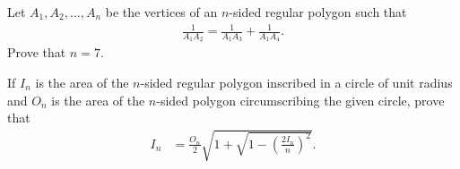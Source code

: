 \begin{question}
    Let $A_1,A_2,\dots,A_n$ be the vertices of an $n$-sided regular polygon such that
    \begin{align*}
        \frac{1}{A_1A_2} = \frac{1}{A_1A_3} + \frac{1}{A_1A_4}.
    \end{align*}
    Prove that $n=7$.
\end{question}


\begin{question}[name=2003 IIT JEE]
    If $I_n$ is the area of the $n$-sided regular polygon inscribed in a circle of unit radius and $O_n$ is the area of the $n$-sided polygon circumscribing the given circle, prove that
    \begin{align*}
        I_n &= \frac{O_n}{2}\sqrt{1+\sqrt{1-\left(\frac{2I_n}{n}\right)^2}}.
    \end{align*}
\end{question}



